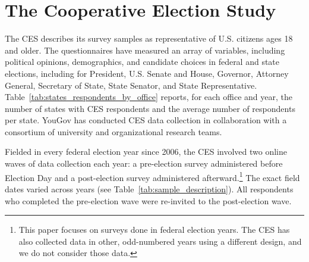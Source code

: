 \documentclass[12pt]{article}
\begin{document}

 


\section*{The Cooperative Election Study}
The CES describes its survey samples as representative of U.S. citizens ages 18 and older. The questionnaires have measured an array of variables, including political opinions, demographics, and candidate choices in federal and state elections, including for President, U.S. Senate and House, Governor, Attorney General, Secretary of State, State Senator, and State Representative. Table~\ref{tab:states_respondents_by_office} reports, for each office and year, the number of states with CES respondents and the average number of respondents per state. YouGov has conducted CES data collection in collaboration with a consortium of university and organizational research teams.

Fielded in every federal election year since 2006, the CES involved two online waves of data collection each year: a pre-election survey administered before Election Day and a post-election survey administered afterward.\footnote{This paper focuses on surveys done in federal election years. The CES has also collected data in other, odd-numbered years using a different design, and we do not consider those data.} The exact field dates varied across years (see Table~\ref{tab:sample_description}). All respondents who completed the pre-election wave were re-invited to the post-election wave.
\end{document}
